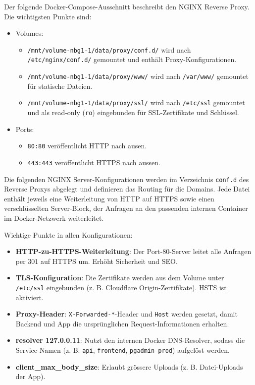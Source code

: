 \documentclass[11pt]{article}
\begin{document}
    Der folgende Docker-Compose-Ausschnitt beschreibt den NGINX Reverse Proxy. Die wichtigsten Punkte sind:
    \begin{itemize}
        \item Volumes:
        \begin{itemize}
            \item \texttt{/mnt/volume-nbg1-1/data/proxy/conf.d/} wird nach \texttt{/etc/nginx/conf.d/} gemountet und enthält Proxy-Konfigurationen.
            \item \texttt{/mnt/volume-nbg1-1/data/proxy/www/} wird nach \texttt{/var/www/} gemountet für statische Dateien.
            \item \texttt{/mnt/volume-nbg1-1/data/proxy/ssl/} wird nach \texttt{/etc/ssl} gemountet und als read-only (\texttt{ro}) eingebunden für SSL-Zertifikate und Schlüssel.
        \end{itemize}
        \item Ports:
        \begin{itemize}
            \item \texttt{80:80} veröffentlicht HTTP nach ausen.
            \item \texttt{443:443} veröffentlicht HTTPS nach aussen.
        \end{itemize}
    \end{itemize}

    

    Die folgenden NGINX Server-Konfigurationen werden im Verzeichnis \texttt{conf.d} des Reverse Proxys abgelegt und definieren das Routing für die Domains.
    Jede Datei enthält jeweils eine Weiterleitung von HTTP auf HTTPS sowie einen verschlüsselten Server-Block, der Anfragen an den passenden
    internen Container im Docker-Netzwerk weiterleitet.

    Wichtige Punkte in allen Konfigurationen:
    \begin{itemize}
        \item \textbf{HTTP-zu-HTTPS-Weiterleitung}: Der Port-80-Server leitet alle Anfragen per 301 auf HTTPS um. Erhöht Sicherheit und SEO.
        \item \textbf{TLS-Konfiguration}: Die Zertifikate werden aus dem Volume unter \texttt{/etc/ssl} eingebunden (z. B. Cloudflare Origin-Zertifikate). HSTS ist aktiviert.
        \item \textbf{Proxy-Header}: \texttt{X-Forwarded-*}-Header und \texttt{Host} werden gesetzt, damit Backend und App die ursprünglichen Request-Informationen erhalten.
        \item \textbf{resolver 127.0.0.11}: Nutzt den internen Docker DNS-Resolver, sodass die Service-Namen (z. B. \texttt{api}, \texttt{frontend}, \texttt{pgadmin-prod}) aufgelöst werden.
        \item \textbf{client\_max\_body\_size}: Erlaubt grössere Uploads (z. B. Datei-Uploads der App).
    \end{itemize}
\end{document}
